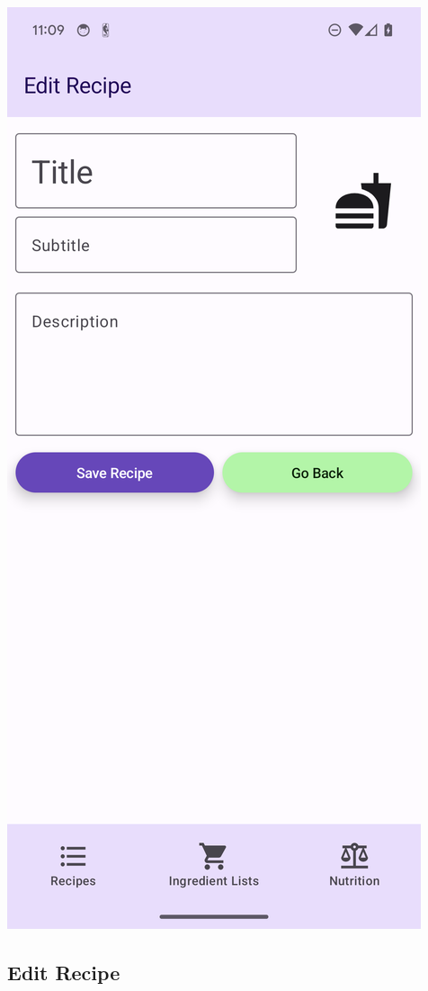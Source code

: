 \documentclass[12pt]{article}
\begin{document}
\begin{center}
\includegraphics[scale=0.175]{../res/img/NewRecipeLight.png}
\end{center}

\subsection{Edit Recipe}
\end{document}
